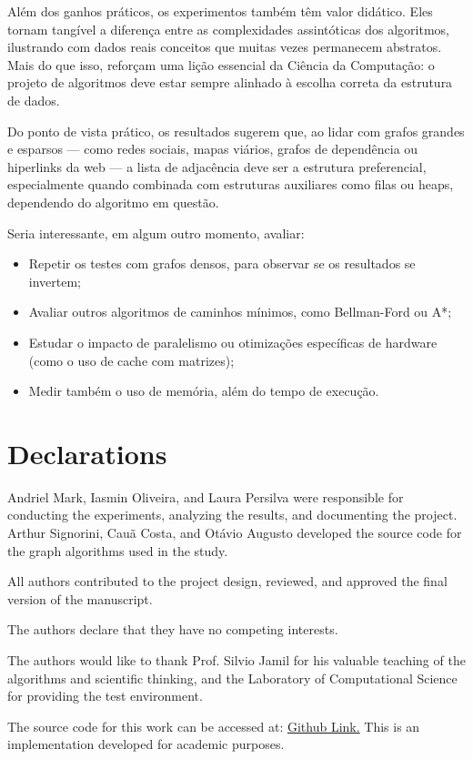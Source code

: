 \documentclass{sbc2023}%
\begin{document}
Além dos ganhos práticos, os experimentos também têm valor didático. Eles tornam tangível a diferença entre as complexidades assintóticas dos algoritmos, ilustrando com dados reais conceitos que muitas vezes permanecem abstratos. Mais do que isso, reforçam uma lição essencial da Ciência da Computação: o projeto de algoritmos deve estar sempre alinhado à escolha correta da estrutura de dados.

Do ponto de vista prático, os resultados sugerem que, ao lidar com grafos grandes e esparsos — como redes sociais, mapas viários, grafos de dependência ou hiperlinks da web — a lista de adjacência deve ser a estrutura preferencial, especialmente quando combinada com estruturas auxiliares como filas ou heaps, dependendo do algoritmo em questão.

Seria interessante, em algum outro momento, avaliar:
\begin{itemize}
  \item Repetir os testes com grafos densos, para observar se os resultados se invertem;
  \item Avaliar outros algoritmos de caminhos mínimos, como Bellman-Ford ou A*;
  \item Estudar o impacto de paralelismo ou otimizações específicas de hardware (como o uso de cache com matrizes);
  \item Medir também o uso de memória, além do tempo de execução.
\end{itemize}

\section*{Declarations}

\begin{contributions}
Andriel Mark, Iasmin Oliveira, and Laura Persilva were responsible for conducting the experiments, analyzing the results, and documenting the project.
Arthur Signorini, Cauã Costa, and Otávio Augusto developed the source code for the graph algorithms used in the study.

All authors contributed to the project design, reviewed, and approved the final version of the manuscript.
\end{contributions}

\begin{interests}
The authors declare that they have no competing interests.
\end{interests}

\begin{acknowledgements}
The authors would like to thank Prof. Silvio Jamil for his valuable teaching of the algorithms and scientific thinking, and the Laboratory of Computational Science for providing the test environment.
\end{acknowledgements}

\begin{Material}
The source code for this work can be accessed at:
\href{https://github.com/otavioaugustoafm/Faculdade/tree/main/Grafos/Trabalho%201/Benchmark}{Github Link.}
This is an implementation developed for academic purposes.
\end{Material}


\end{document}
